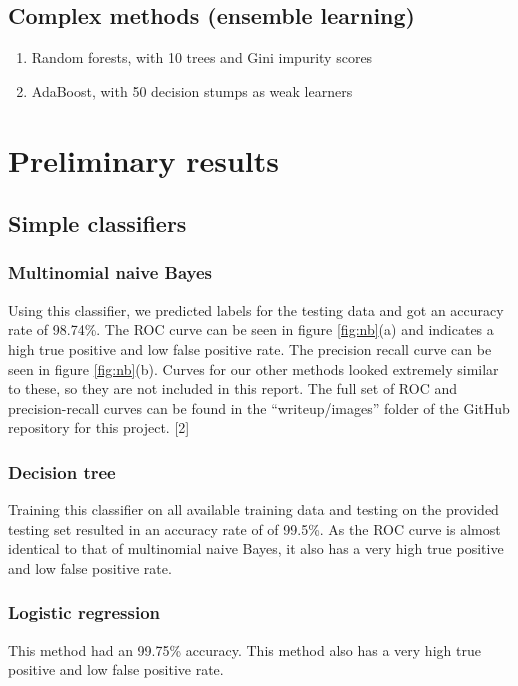 \documentclass{article} %
\begin{document}
\subsection{Complex methods (ensemble learning)}
\begin{enumerate}
  \item Random forests, with 10 trees and Gini impurity scores 
  \item AdaBoost, with 50 decision stumps as weak learners
\end{enumerate}

\section{Preliminary results}
\subsection{Simple classifiers}
\subsubsection{Multinomial naive Bayes}
Using this classifier, we predicted labels for the testing data and got an accuracy rate of 98.74\%. The ROC curve can be seen in figure \ref{fig:nb}(a) and indicates a high true positive and low false positive rate. The precision recall curve can be seen in figure \ref{fig:nb}(b). Curves for our other methods looked extremely similar to these, so they are not included in this report. The full set of ROC and precision-recall curves can be found in the ``writeup/images'' folder of the GitHub repository for this project. [2]

\subsubsection{Decision tree}
Training this classifier on all available training data and testing on the provided testing set resulted in an accuracy rate of of 99.5\%. As the ROC curve is almost identical to that of multinomial naive Bayes, it also has a very high true positive and low false positive rate. 

\subsubsection{Logistic regression}
This method had an 99.75\% accuracy. This method also has a very high true positive and low false positive rate. 
\end{document}
